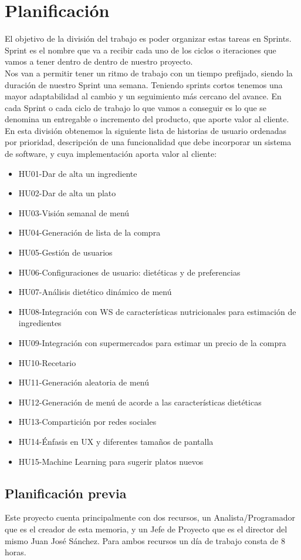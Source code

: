 \documentclass[12pt, a4paper, twoside]{book}
\begin{document}
	\section{Planificación}
	El objetivo de la división del trabajo es poder organizar estas tareas en Sprints.\\
	Sprint es el nombre que va a recibir cada uno de los ciclos o iteraciones que vamos a tener dentro de dentro de nuestro proyecto.\\	
	Nos van a permitir tener un ritmo de trabajo con un tiempo prefijado, siendo la duración de nuestro Sprint una semana. Teniendo sprints cortos tenemos una mayor adaptabilidad al cambio y un seguimiento más cercano del avance.	En cada Sprint o cada ciclo de trabajo lo que vamos a conseguir es lo que se denomina un entregable o incremento del producto, que aporte valor al cliente.
	En esta división obtenemos la siguiente lista de historias de usuario ordenadas por prioridad, descripción de una funcionalidad que debe incorporar un sistema de software, y cuya implementación aporta valor al cliente:
	\begin{itemize}
		\item HU01-Dar de alta un ingrediente
		\item HU02-Dar de alta un plato
		\item HU03-Visión semanal de menú
		\item HU04-Generación de lista de la compra
		\item HU05-Gestión de usuarios
		\item HU06-Configuraciones de usuario: dietéticas y de preferencias
		\item HU07-Análisis dietético dinámico de menú
		\item HU08-Integración con WS de características nutricionales para estimación de ingredientes
		\item HU09-Integración con supermercados para estimar un precio de la compra
		\item HU10-Recetario
		\item HU11-Generación aleatoria de menú
		\item HU12-Generación de menú de acorde a las características dietéticas
		\item HU13-Compartición por redes sociales
		\item HU14-Énfasis en UX y diferentes tamaños de pantalla
		\item HU15-Machine Learning para sugerir platos nuevos
	\end{itemize}
	\subsection{Planificación previa}
	Este proyecto cuenta principalmente con dos recursos, un Analista/Programador que es el creador de esta memoria, y un Jefe de Proyecto que es el director del mismo Juan José Sánchez. Para ambos recursos un día de trabajo consta de 8 horas.
\end{document}
